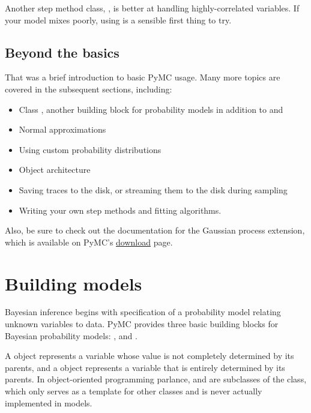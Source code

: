 \documentclass[letterpaper,10pt,english]{sphinxmanual}
\begin{document}
Another step method class, , is better at handling highly-correlated variables. If your model mixes poorly, using  is a sensible first thing to try.


\section{Beyond the basics}
\label{tutorial:beyond-the-basics}
That was a brief introduction to basic PyMC usage. Many more topics are covered in the subsequent sections, including:
\begin{itemize}
\item {} 
Class , another building block for probability models in addition to  and 

\item {} 
Normal approximations

\item {} 
Using custom probability distributions

\item {} 
Object architecture

\item {} 
Saving traces to the disk, or streaming them to the disk during sampling

\item {} 
Writing your own step methods and fitting algorithms.

\end{itemize}

Also, be sure to check out the documentation for the Gaussian process extension, which is available on PyMC's \href{http://code.google.com/p/pymc/downloads/list}{download} page.


\chapter{Building models}
\label{modelbuilding:chap-modelbuilding}\label{modelbuilding:building-models}\label{modelbuilding::doc}
Bayesian inference begins with specification of a probability model relating unknown variables to data. PyMC provides three basic building blocks for Bayesian probability models: ,  and .

A  object represents a variable whose value is not completely determined by its parents, and a  object represents a variable that is entirely determined by its parents. In object-oriented programming parlance,  and  are subclasses of the  class, which only serves as a template for other classes and is never actually implemented in models.
\end{document}
